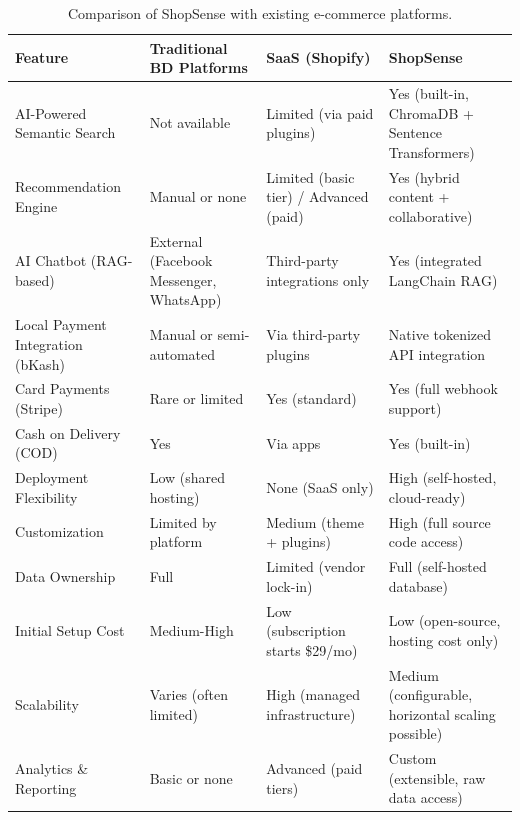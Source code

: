 \begin{table}[H]
  \centering
  \caption{Comparison of ShopSense with existing e-commerce platforms.}
  \label{tab:platform-comparison}
  \small
  \begin{tabular}{|p{3.2cm}|p{3.2cm}|p{3.2cm}|p{3.2cm}|}
    \hline
    \textbf{Feature} & \textbf{Traditional BD Platforms} & \textbf{SaaS (Shopify)} & \textbf{ShopSense} \\
    \hline
    AI-Powered Semantic Search & Not available & Limited (via paid plugins) & Yes (built-in, ChromaDB + Sentence Transformers) \\
    \hline
    Recommendation Engine & Manual or none & Limited (basic tier) / Advanced (paid) & Yes (hybrid content + collaborative) \\
    \hline
    AI Chatbot (RAG-based) & External (Facebook Messenger, WhatsApp) & Third-party integrations only & Yes (integrated LangChain RAG) \\
    \hline
    Local Payment Integration (bKash) & Manual or semi-automated & Via third-party plugins & Native tokenized API integration \\
    \hline
    Card Payments (Stripe) & Rare or limited & Yes (standard) & Yes (full webhook support) \\
    \hline
    Cash on Delivery (COD) & Yes & Via apps & Yes (built-in) \\
    \hline
    Deployment Flexibility & Low (shared hosting) & None (SaaS only) & High (self-hosted, cloud-ready) \\
    \hline
    Customization & Limited by platform & Medium (theme + plugins) & High (full source code access) \\
    \hline
    Data Ownership & Full & Limited (vendor lock-in) & Full (self-hosted database) \\
    \hline
    Initial Setup Cost & Medium-High & Low (subscription starts \$29/mo) & Low (open-source, hosting cost only) \\
    \hline
    Scalability & Varies (often limited) & High (managed infrastructure) & Medium (configurable, horizontal scaling possible) \\
    \hline
    Analytics \& Reporting & Basic or none & Advanced (paid tiers) & Custom (extensible, raw data access) \\
    \hline
  \end{tabular}
\end{table}

